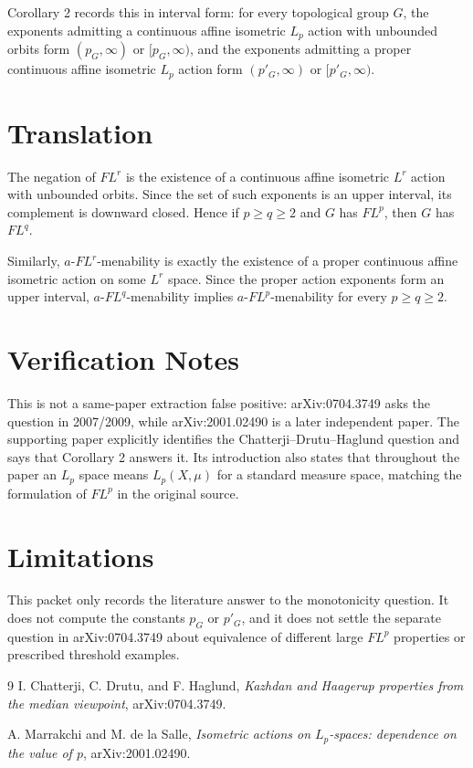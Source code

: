 \documentclass[11pt]{article}
\begin{document}
Corollary 2 records this in interval form: for every topological group $G$,
the exponents admitting a continuous affine isometric $L_p$ action with
unbounded orbits form $(p_G,\infty)$ or $[p_G,\infty)$, and the exponents
admitting a proper continuous affine isometric $L_p$ action form
$(p'_G,\infty)$ or $[p'_G,\infty)$.

\section*{Translation}

The negation of $FL^r$ is the existence of a continuous affine isometric
$L^r$ action with unbounded orbits.  Since the set of such exponents is an
upper interval, its complement is downward closed.  Hence if $p\ge q\ge 2$
and $G$ has $FL^p$, then $G$ has $FL^q$.

Similarly, $a$-$FL^r$-menability is exactly the existence of a proper
continuous affine isometric action on some $L^r$ space.  Since the proper
action exponents form an upper interval, $a$-$FL^q$-menability implies
$a$-$FL^p$-menability for every $p\ge q\ge 2$.

\section*{Verification Notes}

This is not a same-paper extraction false positive: arXiv:0704.3749 asks the
question in 2007/2009, while arXiv:2001.02490 is a later independent paper.
The supporting paper explicitly identifies the Chatterji--Drutu--Haglund
question and says that Corollary 2 answers it.  Its introduction also states
that throughout the paper an $L_p$ space means $L_p(X,\mu)$ for a standard
measure space, matching the formulation of $FL^p$ in the original source.

\section*{Limitations}

This packet only records the literature answer to the monotonicity question.
It does not compute the constants $p_G$ or $p'_G$, and it does not settle the
separate question in arXiv:0704.3749 about equivalence of different large
$FL^p$ properties or prescribed threshold examples.

\begin{thebibliography}{9}
I. Chatterji, C. Drutu, and F. Haglund,
\emph{Kazhdan and Haagerup properties from the median viewpoint},
arXiv:0704.3749.

A. Marrakchi and M. de la Salle,
\emph{Isometric actions on $L_p$-spaces: dependence on the value of $p$},
arXiv:2001.02490.
\end{thebibliography}
\end{document}
